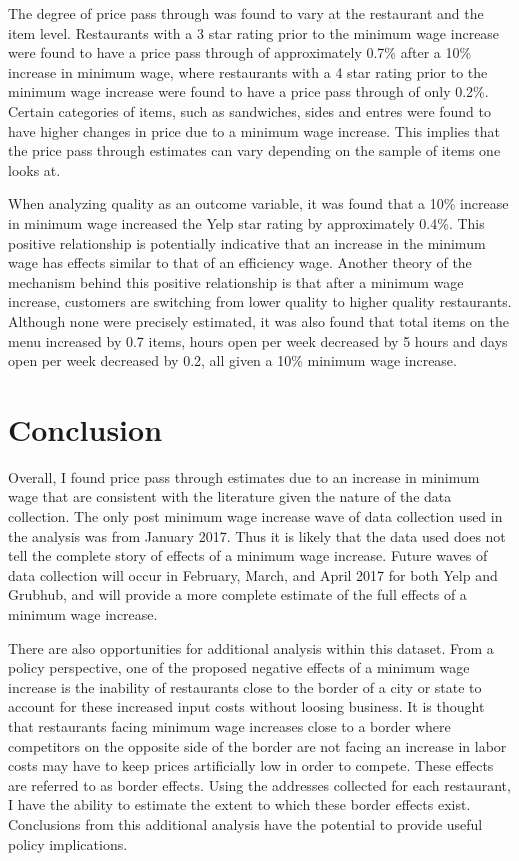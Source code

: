 \documentclass[11pt]{article}
\begin{document}
The degree of price pass through was found to vary at the restaurant and the item level. Restaurants with a 3 star rating prior to the minimum wage increase were found to have a price pass through of approximately 0.7\% after a 10\% increase in minimum wage, where restaurants with a 4 star rating prior to the minimum wage increase were found to have a price pass through of only 0.2\%. Certain categories of items, such as sandwiches, sides and entres were found to have higher changes in price due to a minimum wage increase. This implies that the price pass through estimates can vary depending on the sample of items one looks at. 

When analyzing quality as an outcome variable, it was found that a 10\% increase in minimum wage increased the Yelp star rating by approximately 0.4\%. This positive relationship is potentially indicative that an increase in the minimum wage has effects similar to that of an efficiency wage. Another theory of the mechanism behind this positive relationship is that after a minimum wage increase, customers are switching from lower quality to higher quality restaurants. Although none were precisely estimated, it was also found that total items on the menu increased by 0.7 items, hours open per week decreased by 5 hours and days open per week decreased by 0.2, all given a 10\% minimum wage increase.




\section{Conclusion}
Overall, I found price pass through estimates due to an increase in minimum wage that are consistent with the literature given the nature of the data collection. The only post minimum wage increase wave of data collection used in the analysis was from January 2017. Thus it is likely that the data used does not tell the complete story of effects of a minimum wage increase. Future waves of data collection will occur in February, March, and April 2017 for both Yelp and Grubhub, and will provide a more complete estimate of the full effects of a minimum wage increase.

There are also opportunities for additional analysis within this dataset. From a policy perspective, one of the proposed negative effects of a minimum wage increase is the inability of restaurants close to the border of a city or state to account for these increased input costs without loosing business. It is thought that restaurants facing minimum wage increases close to a border where competitors on the opposite side of the border are not facing an increase in labor costs may have to keep prices artificially low in order to compete. These effects are referred to as border effects. Using the addresses collected for each restaurant, I have the ability to estimate the extent to which these border effects exist. Conclusions from this additional analysis have the potential to provide useful policy implications. 
\end{document}
